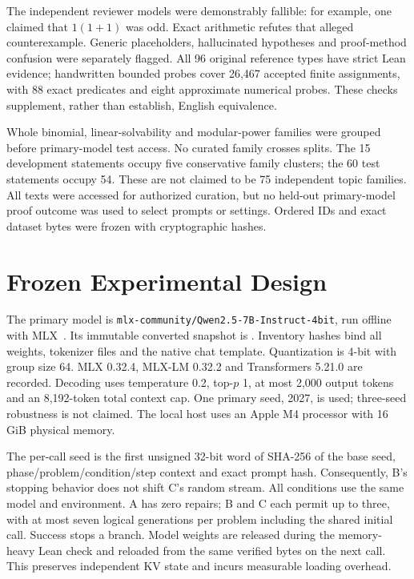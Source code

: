 \documentclass[runningheads,a4paper]{llncs}
\begin{document}
The independent reviewer models were demonstrably fallible: for example, one
claimed that $1(1+1)$ was odd. Exact arithmetic refutes that alleged
counterexample. Generic placeholders, hallucinated hypotheses and proof-method
confusion were separately flagged. All 96 original reference types have strict
Lean evidence; handwritten bounded probes cover 26,467 accepted finite
assignments, with 88 exact predicates and eight approximate numerical probes.
These checks supplement, rather than establish, English equivalence.

Whole binomial, linear-solvability and modular-power families were grouped before
primary-model test access. No curated family crosses splits. The 15 development
statements occupy five conservative family clusters; the 60 test statements
occupy 54. These are not claimed to be 75 independent topic families.
All texts were accessed for authorized curation, but no held-out primary-model
proof outcome was used to select prompts or settings. Ordered IDs and exact
dataset bytes were frozen with cryptographic hashes.

\section{Frozen Experimental Design}
The primary model is \texttt{mlx-community/Qwen2.5-7B-Instruct-4bit}, run
offline with MLX~\cite{qwenmlx,mlxlm}. Its immutable converted snapshot is
. Inventory hashes bind all weights, tokenizer files and
the native chat template. Quantization is 4-bit with group size 64. MLX 0.32.4,
MLX-LM 0.32.2 and Transformers 5.21.0 are recorded. Decoding uses temperature
0.2, top-$p$ 1, at most 2,000 output tokens and an 8,192-token total context cap.
One primary seed, 2027, is used; three-seed robustness is not claimed.
The local host uses an Apple M4 processor with 16 GiB physical memory.

The per-call seed is the first unsigned 32-bit word of SHA-256 of the base
seed, phase/problem/condition/step context and exact prompt hash. Consequently,
B's stopping behavior does not shift C's random stream. All conditions use
the same model and environment. A has zero repairs; B and C each permit up to
three, with at most seven logical generations per problem including the shared
initial call. Success stops a branch. Model weights are released during the
memory-heavy Lean check and reloaded from the same verified bytes on the next
call. This preserves independent KV state and incurs measurable loading overhead.
\end{document}
